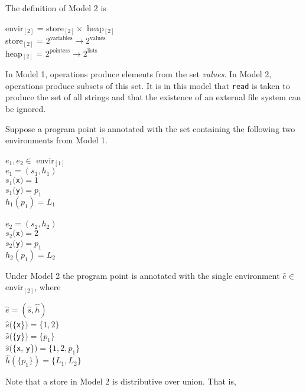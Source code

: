 The definition of Model 2 is 


\goodbreak
\begin{specialcode}{}
\>envir$_{[2]}$  =  store$_{[2]} \times $ heap$_{[2]}$\\
\>store$_{[2]}$  =  $2^{\textrm{variables}} \rightarrow 2^{\textrm{values}}$ \\
\>heap$_{[2]}$   =  $2^{\textrm{pointers}} \rightarrow 2^{\textrm{lists}}$ \\
\end{specialcode}

In Model 1, operations produce elements from the set
\textit{values}. In Model 2, operations produce subsets of this
set. It is in this model that \texttt{read} is taken to produce the
set of all strings and that the existence of an external file system
can be ignored.

Suppose a program point is annotated with the set containing the
following two environments from Model 1.

\goodbreak
\begin{iconcode}
\> $e_1,e_2 \in$ envir$_{[1]}$\\
\> $e_1 = (s_1, h_1)$\\
\> $s_1($\texttt{x}$) = 1$\\
\> $s_1($\texttt{y}$) = p_1$\\
\> $h_1(p_1) = L_1$\\
\\
\> $e_2 = (s_2, h_2)$\\
\> $s_2($\texttt{x}$) = 2$\\
\> $s_2($\texttt{y}$) = p_1$\\
\> $h_2(p_1) = L_2$\\
\end{iconcode}

\noindent
Under Model 2 the program point is annotated with the single
environment $\hat{e} {\in}$ envir$_{[2]}$, where

\goodbreak
\begin{iconcode}
\> $\hat{e} = (\hat{s},\hat{h})$\\
\> $\hat{s}(\{$\texttt{x}\}$) = \{1,2\}$\\
\> $\hat{s}(\{$\texttt{y}\}$) = \{p_1\}$\\
\> $\hat{s}(\{$\texttt{x}, \texttt{y}\}$) = \{1, 2, p_1\}$\\
\> $\hat{h}(\{p_1\}) = \{L_1, L_2\}$\\
\end{iconcode}

\noindent
Note that a store in Model 2 is distributive over union. That is, 


